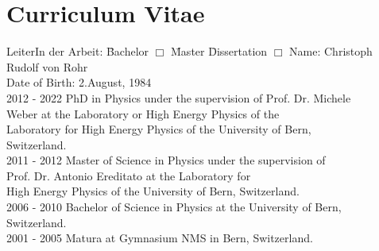 % 
% 
% 
% 
% 
% 

\cleardoublepage
\listoffigures

\cleardoublepage
\listoftables

\printglossary[type=acronym]
\cleardoublepage

\printglossary
\cleardoublepage

\printbibliography[heading=bibintoc] %
\clearpage{\thispagestyle{empty}\cleardoublepage}

\thispagestyle{empty}

\clearpage{\thispagestyle{empty}\cleardoublepage}

\chapter*{Curriculum Vitae}
\thispagestyle{empty}
\vspace*{3ex}
\begin{tabbing}
    LeiterIn der Arbeit: \hspace{0.5cm}\=Bachelor $\Box$\hspace{1cm} \=Master \hspace{1cm} \=Dissertation $\Box$ \kill 
	Name: \> Christoph Rudolf von Rohr\\[2ex]
	Date of Birth: 		\> 2.August, 1984\\[2ex]

	2012 - 2022			\> PhD in Physics under the supervision of Prof. Dr. Michele\\
						\> Weber at the Laboratory or High Energy Physics of the\\
						\> Laboratory for High Energy Physics of the University of Bern,\\ 
                        \> Switzerland.\\[2ex]
	2011 - 2012			\> Master of Science in Physics under the supervision of \\
						\> Prof. Dr. Antonio Ereditato at the Laboratory for \\
						\> High Energy Physics of the University of Bern, Switzerland.\\[2ex]
	2006 - 2010			\> Bachelor of Science in Physics at the University of Bern, \\
						\> Switzerland.\\[2ex]
	2001 - 2005			\> Matura at Gymnasium NMS in Bern, Switzerland.\\
\end{tabbing}
